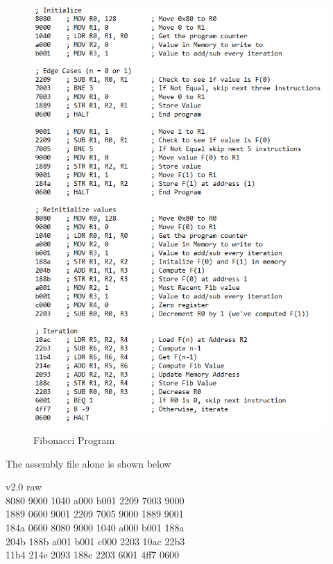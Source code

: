 \documentclass[12pt, letter]{article}
\begin{document}
	\begin{figure}
		\centering
		\includegraphics[scale = 1]{fib}
		\caption{Fibonacci Program}
		\label{fig:fib}
	\end{figure}
	\newpage
	The assembly file alone is shown below\\
	\bigskip
	\begin{tcolorbox}[colback = bg, boxrule = 0pt]
		v2.0 raw\\
		8080 9000 1040 a000 b001 2209 7003 9000\\
		1889 0600 9001 2209 7005 9000 1889 9001\\
		184a 0600 8080 9000 1040 a000 b001 188a\\
		204b 188b a001 b001 c000 2203 10ac 22b3\\
		11b4 214e 2093 188c 2203 6001 4ff7 0600\\
	\end{tcolorbox}
	
\end{document}
